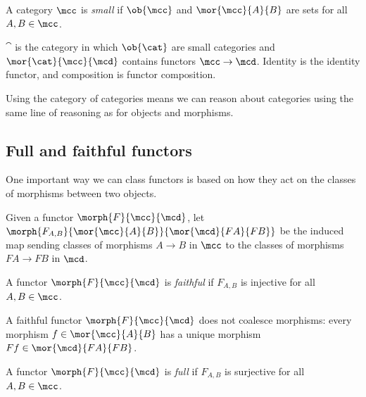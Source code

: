 \begin{definition}
    A category \(\mcc\) is \emph{small} if \(\ob{\mcc}\) and
    \(\mor{\mcc}{A}{B}\) are sets for all \(A, B \in \mcc\).
\end{definition}

\begin{example}
    \(\cat\) is the category in which \(\ob{\cat}\) are small categories and
    \(\mor{\cat}{\mcc}{\mcd}\) contains functors \(\mcc \to \mcd\).
    Identity is the identity functor, and composition is functor composition.
\end{example}

Using the category of categories means we can reason about categories using the
same line of reasoning as for objects and morphisms.

\subsection{Full and faithful functors}

One important way we can class functors is based on how they act on the classes
of morphisms between two objects.

\begin{notation}
    Given a functor \(\morph{F}{\mcc}{\mcd}\), let \(
    \morph{F_{A,B}}{\mor{\mcc}{A}{B}}{\mor{\mcd}{FA}{FB}}
    \) be the induced map sending classes of morphisms \(A \to B\) in \(\mcc\)
    to the classes of morphisms \(FA \to FB\) in \(\mcd\).
\end{notation}

\begin{definition}
    A functor \(\morph{F}{\mcc}{\mcd}\) is \emph{faithful} if \(F_{A,B}\) is
    injective for all \(A,B \in \mcc\).
\end{definition}

A faithful functor \(\morph{F}{\mcc}{\mcd}\) does not coalesce morphisms: every
morphism \(f \in \mor{\mcc}{A}{B}\) has a unique morphism
\(Ff \in \mor{\mcd}{FA}{FB}\).

\begin{definition}
    A functor \(\morph{F}{\mcc}{\mcd}\) is \emph{full} if \(F_{A,B}\) is
    surjective for all \(A,B \in \mcc\).
\end{definition}


